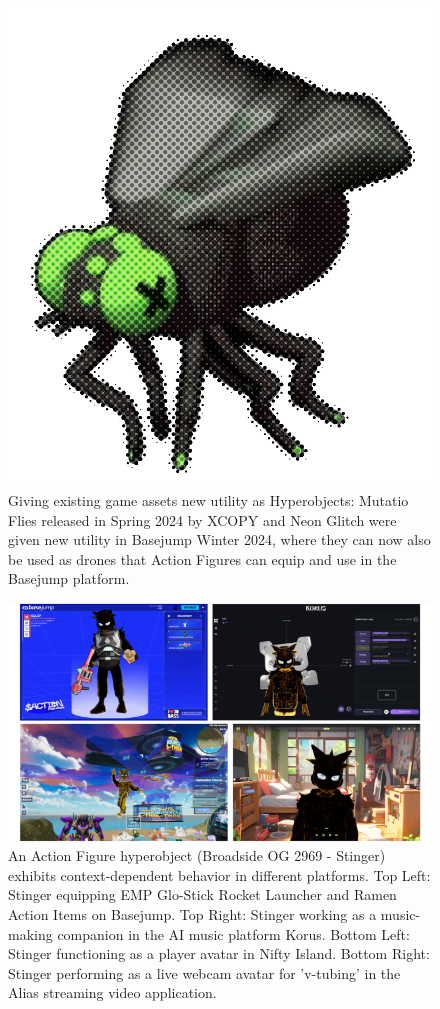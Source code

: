\begin{figure}[t]
  \centering
  \includegraphics[width=0.7\columnwidth]{images/image5b.png}
  \vspace{1em}
  \caption{Giving existing game assets new utility as  Hyperobjects: Mutatio Flies released in Spring 2024 by XCOPY and Neon Glitch were given new utility in Basejump Winter 2024, where they can now also be used as drones that Action Figures can equip and use in the Basejump platform.}
  \label{fig:mutatio_fly}
\end{figure}
  
\begin{figure}
\centering
\includegraphics[width=\columnwidth]{images/image6.png}
\caption{An Action Figure hyperobject (Broadside OG 2969 - Stinger) exhibits context-dependent behavior in different platforms. Top Left: Stinger equipping EMP Glo-Stick Rocket Launcher and Ramen Action Items on Basejump. Top Right: Stinger working as a music-making companion in the AI music platform Korus. Bottom Left: Stinger functioning as a player avatar in Nifty Island. Bottom Right: Stinger performing as a live webcam avatar for 'v-tubing' in the Alias streaming video application.}
\label{fig:context_dependent}
\end{figure}


